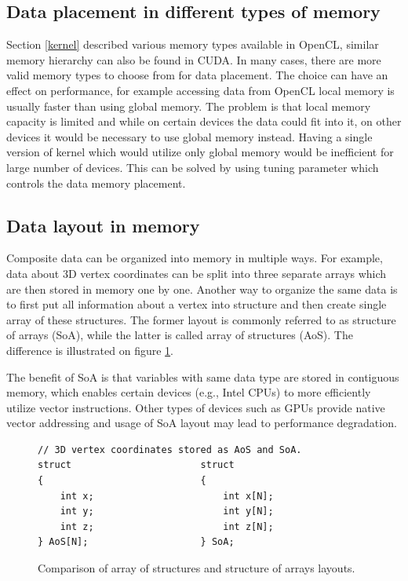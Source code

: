 \documentclass
[
    digital, %
    oneside, %
    table, %
    nolof, %
    nolot, %
    nocover %
]{fithesis3}
\begin{document}
\subsection{Data placement in different types of memory}
Section \ref{kernel} described various memory types available in OpenCL, similar memory hierarchy can also be found in CUDA. In many cases, there are
more valid memory types to choose from for data placement. The choice can have an effect on performance, for example accessing data from OpenCL local
memory is usually faster than using global memory. The problem is that local memory capacity is limited and while on certain devices the data could
fit into it, on other devices it would be necessary to use global memory instead. Having a single version of kernel which would utilize only global
memory would be inefficient for large number of devices. This can be solved by using tuning parameter which controls the data memory placement.

\subsection{Data layout in memory}
Composite data can be organized into memory in multiple ways. For example, data about 3D vertex coordinates can be split into three separate arrays
which are then stored in memory one by one. Another way to organize the same data is to first put all information about a vertex into structure and
then create single array of these structures. The former layout is commonly referred to as structure of arrays (SoA), while the latter is called array
of structures (AoS). The difference is illustrated on figure \ref{aos_soa}.

The benefit of SoA is that variables with same data type are stored in contiguous memory, which enables certain devices (e.g., Intel CPUs) to more
efficiently utilize vector instructions. Other types of devices such as GPUs provide native vector addressing and usage of SoA layout may lead to
performance degradation.

\begin{figure}
\begin{lstlisting}
// 3D vertex coordinates stored as AoS and SoA.
struct                       struct
{                            {
    int x;                       int x[N];
    int y;                       int y[N];
    int z;                       int z[N];
} AoS[N];                    } SoA;
\end{lstlisting}
\caption{Comparison of array of structures and structure of arrays layouts.}
\label{aos_soa}
\end{figure}
\end{document}
